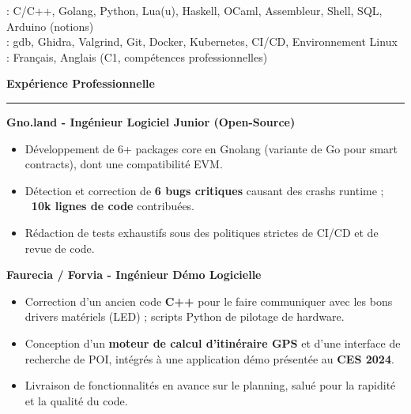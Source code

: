 \documentclass[9pt]{extarticle}
\begin{document}
\hspace*{5pt}{\bfseries Maîtrise}: C/C++, Golang, Python, Lua(u), Haskell, OCaml, Assembleur, Shell, SQL, Arduino (notions)
\\
\hspace*{5pt}{\bfseries Outils}: gdb, Ghidra, Valgrind, Git, Docker, Kubernetes, CI/CD, Environnement Linux
\\
\hspace*{5pt}{\bfseries Langues}: Français, Anglais (C1, compétences professionnelles)

\par\vspace{5pt}


{\large\bfseries Expérience Professionnelle}
\par\vspace{-8pt}
\rule{\linewidth}{0.4pt}
\par\vspace{5pt}

{\bfseries Gno.land - Ingénieur Logiciel Junior (Open-Source)}
\begin{itemize}[noitemsep, topsep=0pt]
	\item Développement de 6+ packages core en Gnolang (variante de Go pour smart contracts), dont une compatibilité EVM.
	\item Détection et correction de {\bfseries 6 bugs critiques} causant des crashs runtime ; {\bfseries ~10k lignes de code} contribuées.
	\item Rédaction de tests exhaustifs sous des politiques strictes de CI/CD et de revue de code.
\end{itemize}

\par\vspace{5pt}

{\bfseries Faurecia / Forvia - Ingénieur Démo Logicielle}
\begin{itemize}[noitemsep, topsep=0pt]
	\item Correction d'un ancien code {\bfseries C++} pour le faire communiquer avec les bons drivers matériels (LED) ; scripts Python de pilotage de hardware.
	\item Conception d'un {\bfseries moteur de calcul d'itinéraire GPS} et d'une interface de recherche de POI, intégrés à une application démo présentée au {\bfseries CES 2024}.
	\item Livraison de fonctionnalités en avance sur le planning, salué pour la rapidité et la qualité du code.
\end{itemize}
\end{document}
